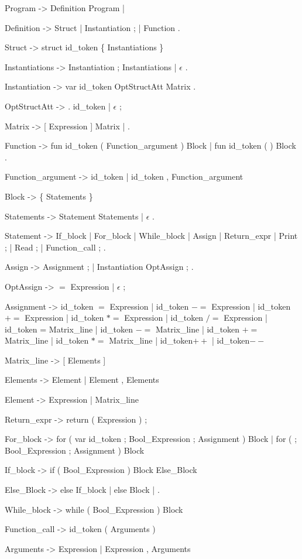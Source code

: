 Program -> Definition Program | \epsilon

Definition -> Struct | Instantiation ; | Function .

Struct -> struct  id_token \{ Instantiations \}

Instantiations -> Instantiation ; Instantiations | $\epsilon$ .

Instantiation -> var id_token OptStructAtt Matrix .

OptStructAtt -> . id_token | $\epsilon$ ;

Matrix -> [ Expression ] Matrix | .

Function -> fun id_token ( Function_argument ) Block  | fun id_token (  ) Block .

Function_argument -> id_token | id_token , Function_argument

Block -> \{ Statements \}

Statements -> Statement Statements | $\epsilon$ .

Statement -> If_block | For_block | While_block | Assign | Return_expr | Print ; | Read ; | Function_call ; .

Assign -> Assignment ; | Instantiation OptAssign ; .

OptAssign -> $=$ Expression | $\epsilon$ ;

Assignment -> id_token $=$ Expression | id_token $-=$ Expression | id_token $+=$ Expression | id_token $*=$ Expression | id_token $/=$ Expression | id_token = Matrix_line | id_token $-=$ Matrix_line | id_token $+=$ Matrix_line | id_token $*=$ Matrix_line  | id_token$++$ | id_token$--$

Matrix_line -> [ Elements ]

Elements -> Element | Element , Elements

Element -> Expression | Matrix_line

Return_expr -> return ( Expression ) ;

For_block -> for ( var id_token ; Bool_Expression ; Assignment ) Block | for ( ; Bool_Expression ; Assignment ) Block 

If_block -> if ( Bool_Expression ) Block Else_Block

Else_Block -> else If_block | else Block |  \epsilon .

While_block -> while ( Bool_Expression ) Block

Function_call -> id_token ( Arguments )

Arguments -> Expression | Expression , Arguments


